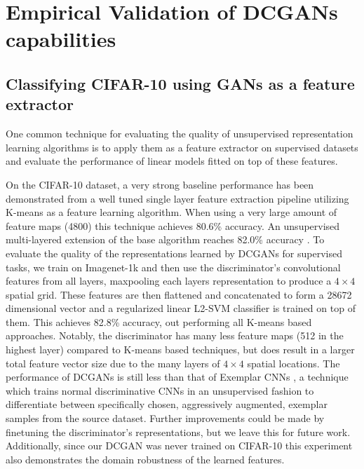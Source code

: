 \documentclass{article} %
\begin{document}
\section{Empirical Validation of DCGANs capabilities}

\subsection{Classifying CIFAR-10 using GANs as a feature extractor}

One common technique for evaluating the quality of unsupervised representation learning algorithms is to apply them as a feature extractor on supervised datasets and evaluate the performance of linear models fitted on top of these features. 

On the CIFAR-10 dataset, a very strong baseline performance has been demonstrated from a well tuned single layer feature extraction pipeline utilizing K-means as a feature learning algorithm. When using a very large amount of feature maps (4800) this technique achieves 80.6\% accuracy. An unsupervised multi-layered extension of the base algorithm reaches 82.0\% accuracy \citep{coates2011selecting}. To evaluate the quality of the representations learned by DCGANs for supervised tasks, we train on Imagenet-1k and then use the discriminator's convolutional features from all layers, maxpooling each layers representation to produce a $4 \times 4$ spatial grid. These features are then flattened and concatenated to form a 28672 dimensional vector and a regularized linear L2-SVM classifier is trained on top of them. This achieves 82.8\% accuracy, out performing all K-means based approaches. Notably, the discriminator has many less feature maps (512 in the highest layer) compared to K-means based techniques, but does result in a larger total feature vector size due to the many layers of $4 \times 4$ spatial locations. The performance of DCGANs is still less than that of Exemplar CNNs \citep{dosovitskiy2014discriminative}, a technique which trains normal discriminative CNNs in an unsupervised fashion to differentiate between specifically chosen, aggressively augmented, exemplar samples from the source dataset. Further improvements could be made by finetuning the discriminator's representations, but we leave this for future work. Additionally, since our DCGAN was never trained on CIFAR-10 this experiment also demonstrates the domain robustness of the learned features. 
\end{document}
